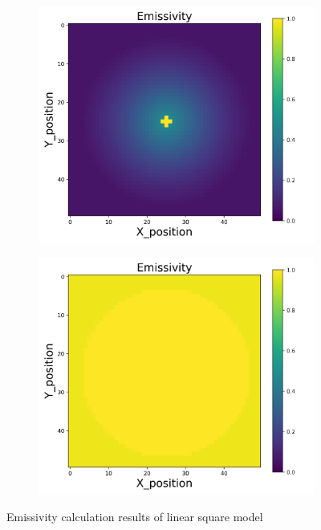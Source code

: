 {\begin{figure}[h]
\begin{minipage}{\textwidth}
\begin{subfigure}{0.27\textwidth}
        \end{subfigure}
        \begin{subfigure}{0.27\textwidth}
            \centering
            \includegraphics[width=\textwidth]{figures/raw_data/32/T3500/lin_square/emi_cal.jpg}
        \end{subfigure}
        \begin{subfigure}{0.27\textwidth}
            \centering
            \includegraphics[width=\textwidth]{figures/raw_data/33/T3500/lin_square/emi_cal.jpg}
        \end{subfigure}
    \end{minipage}
    \caption{Emissivity calculation results of linear square model}  
\end{figure}

}
